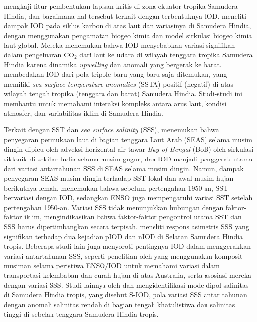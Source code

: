 \begin{spacing}{1.5}
	 mengkaji fitur pembentukan lapisan kritis di zona ekuator-tropika Samudera Hindia, dan bagaimana hal tersebut terkait dengan terbentuknya IOD.  meneliti dampak IOD pada siklus karbon di atas laut dan variasinya di Samudera Hindia, dengan menggunakan pengamatan biogeo kimia dan model sirkulasi biogeo kimia laut global. Mereka menemukan bahwa IOD menyebabkan variasi signifikan dalam pengeluaran CO$_2$ dari laut ke udara di wilayah tenggara tropika Samudera Hindia karena dinamika \textit{upwelling} dan anomali yang bergerak ke barat.  membedakan IOD dari pola tripole baru yang baru saja ditemukan, yang memiliki \textit{sea surface temperature anomalies} (SSTA) positif (negatif) di atas wilayah tengah tropika (tenggara dan barat) Samudera Hindia. Studi-studi ini membantu untuk memahami interaksi kompleks antara arus laut, kondisi atmosfer, dan variabilitas iklim di Samudera Hindia.
	
	Terkait dengan SST dan \textit{sea surface salinity} (SSS),  menemukan bahwa penyegaran permukaan laut di bagian tenggara Laut Arab (SEAS) selama musim dingin dipicu oleh adveksi horizontal air tawar \textit{Bay of Bengal} (BoB) oleh sirkulasi siklonik di sekitar India selama musim gugur, dan IOD menjadi penggerak utama dari variasi antartahunan SSS di SEAS selama musim dingin. Namun, dampak penyegaran SEAS musim dingin terhadap SST lokal dan awal musim hujan berikutnya lemah.  menemukan bahwa sebelum pertengahan 1950-an, SST bervariasi dengan IOD, sedangkan ENSO juga mempengaruhi variasi SST setelah pertengahan 1950-an. Variasi SSS tidak menunjukkan hubungan dengan faktor-faktor iklim, mengindikasikan bahwa faktor-faktor pengontrol utama SST dan SSS harus dipertimbangkan secara terpisah.  meneliti respons asimetris SSS yang signifikan terhadap dua kejadian pIOD dan nIOD di Selatan Samudera Hindia tropis. Beberapa studi lain juga menyoroti pentingnya IOD dalam menggerakkan variasi antartahunan SSS, seperti penelitian oleh  yang menggunakan komposit musiman selama peristiwa ENSO/IOD untuk memahami variasi dalam transportasi kelembaban dan curah hujan di atas Australia, serta asosiasi mereka dengan variasi SSS. Studi lainnya oleh  dan  mengidentifikasi mode dipol salinitas di Samudera Hindia tropis, yang disebut S-IOD, pola variasi SSS antar tahunan dengan anomali salinitas rendah di bagian tengah khatulistiwa dan salinitas tinggi di sebelah tenggara Samudera Hindia tropis.
	

\end{spacing}
